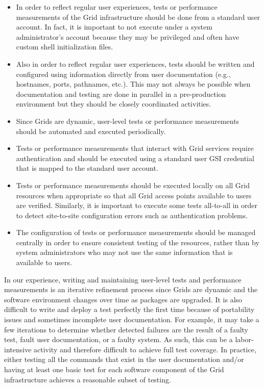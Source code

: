 \documentclass[times,10pt,twocolumn]{article}
\begin{document}
\begin{itemize}

\item In order to reflect regular user experiences, tests or performance
measurements of the Grid infrastructure should be done from a standard user
account.  In fact, it is important to not execute under a system
administrator's account because they may be privileged and often have custom
shell initialization files.

\item Also in order to reflect regular user experiences, tests should be
written and configured using information directly from user documentation
(e.g., hostnames, ports, pathnames, etc.).  This may not always be possible
when documentation and testing are done in parallel in a pre-production
environment but they should be closely coordinated activities. 

\item Since Grids are dynamic, user-level tests or performance measurements
should be automated and executed periodically.

\item Tests or performance measurements that interact with Grid services
require authentication and should be executed using a standard user GSI
credential that is mapped to the standard user account.  

\item Tests or performance measurements should be executed locally on all Grid
resources when appropriate so that all Grid access points available to users
are verified.  Similarly, it is important to execute some tests all-to-all
in order to detect site-to-site configuration errors such as authentication
problems.

\item The configuration of tests or performance measurements should be managed
centrally in order to ensure consistent testing of the resources, rather than
by system administrators who may not use the same information that is
available to users.

\end{itemize}

\noindent In our experience, writing and maintaining user-level tests and
performance measurements is an iterative refinement process since Grids are
dynamic and the software environment changes over time as packages are
upgraded.  It is also difficult to write and deploy a test perfectly the first
time because of portability issues and sometimes incomplete user
documentation.  For example, it may take a few iterations to determine whether
detected failures are the result of a faulty test, fault user documentation,
or a faulty system.  As such, this can be a labor-intensive activity and
therefore difficult to achieve full test coverage.  In practice, 
either
testing all the commands that exist in the user documentation and/or having at
least one basic test for each software component of the Grid infrastructure
achieves a reasonable subset of testing.
\end{document}
